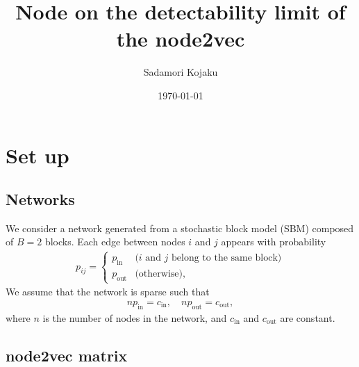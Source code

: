 \documentclass[12pt]{article} %
\author{Sadamori Kojaku}
\begin{document}

\title{Node on the detectability limit of the node2vec} %
\date{\today}
\maketitle %

\section{Set up}
\label{sec:introduction}

\subsection{Networks}

We consider a network generated from a stochastic block model (SBM) composed of $B=2$ blocks.
Each edge between nodes $i$ and $j$ appears with probability
\begin{align}
    p_{ij} = \left\{
    \begin{array}{cl}
        p_{\text{in}}  & \text{($i$ and $j$ belong to the same block)} \\
        p_{\text{out}} & \text{(otherwise)},
    \end{array}
    \right.
\end{align}
We assume that the network is sparse such that
\begin{align}
    n p_{\text{in}} = c_{\text{in}},\quad n p_{\text{out}} = c_{\text{out}},
\end{align}
where $n$ is the number of nodes in the network, and $c_{\text{in}}$ and $c_{\text{out}}$ are constant.

\subsection{node2vec matrix}
\end{document}
